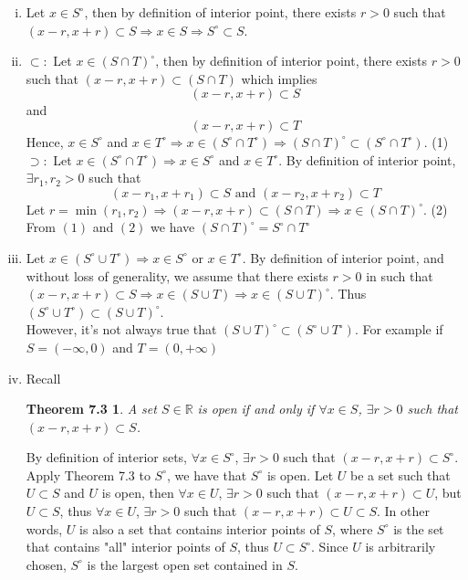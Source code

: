 \documentclass[10pt,letterpaper]{article}
\begin{document}
	\begin{enumerate}[(i)]
		\item Let $x \in S^{\circ}$, then by definition of interior point,
		there exists $r > 0$ such that $(x - r, x + r) \subset S \Rightarrow
		x \in S \Rightarrow S^{\circ} \subset S$.
		
		\item $\subset:$ Let $x \in (S \cap T)^{\circ}$, then by definition of interior point, there exists
		$r > 0$ such that $(x - r, x + r) \subset (S \cap T)$ which implies
		$$(x - r, x + r) \subset S$$
		and 
		$$(x - r, x + r) \subset T$$
		Hence, $x \in S^{\circ}$ and $x \in T^{\circ} \Rightarrow x \in (S^{\circ} \cap T^{\circ})
		\Rightarrow (S \cap T)^{\circ} \subset (S^{\circ} \cap T^{\circ})$. (1)\\
		$\supset:$ Let $x \in (S^{\circ} \cap T^{\circ}) \Rightarrow
		x \in S^{\circ}$ and $x \in T^{\circ}$. By definition of interior point, $\exists r_1, r_2 > 0$ such 
		that
		$$(x - r_1, x + r_1) \subset S \text{ and } (x - r_2, x + r_2) \subset T$$
		Let $r = \min(r_1, r_2) \Rightarrow (x - r, x + r) \subset (S \cap T) \Rightarrow
		x \in (S \cap T)^{\circ}$. (2) \\
		From $(1)$ and $(2)$ we have $(S \cap T)^{\circ} = S^{\circ} \cap T^{\circ}$
		
		\item Let $x \in (S^{\circ} \cup T^{\circ}) \Rightarrow x \in S^{\circ}$ or $x \in T^{\circ}$.
		By definition of interior point, and without loss of generality, we assume that there exists
		$r > 0$ in such that $(x - r, x + r) \subset S \Rightarrow x \in (S \cup T) \Rightarrow
		x \in (S \cup T)^{\circ}$. Thus $(S^{\circ} \cup T^{\circ}) \subset (S \cup T)^{\circ}$. \\
		However, it's not always true that $(S \cup T)^{\circ} \subset (S^{\circ} \cup T^{\circ})$.
		For example if $S = (-\infty, 0)$ and $T = (0, +\infty)$
		
		\item Recall
		\newtheorem*{tm}{Theorem 7.3}
		\begin{tm}
		A set $S \in \mathbb{R}$ is open if and only if $\forall x \in S$, $\exists r > 0$ such that
		$(x - r, x + r) \subset S$.
		\end{tm}
		By definition of interior sets, $\forall x \in S^{\circ}$, $\exists r > 0$ such that
		$(x - r, x + r) \subset S^{\circ}$. Apply Theorem 7.3 to $S^{\circ}$, we have that $S^{\circ}$ is open.
		Let $U$ be a set such that $U \subset S$
		and $U$ is open, then $\forall x \in U$, $\exists r > 0$ such that $(x - r, x + r) \subset U$,
		but $U \subset S$, thus $\forall x \in U$, $\exists r > 0$ such that $(x - r, x + r) \subset U \subset S$.
		In other words, $U$ is also a set that contains interior points of $S$, where $S^{\circ}$ is the 
		set that contains "all" interior points of $S$, thus $U \subset S^{\circ}$. Since $U$ is arbitrarily chosen,
		$S^{\circ}$ is the largest open set contained in $S$. 
		 
	\end{enumerate}
	
\end{document}

